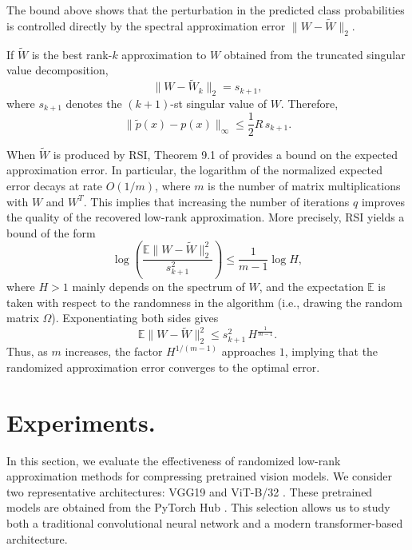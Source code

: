 \documentclass[twoside,leqno,onecolumn]{article}
\begin{document}
\begin{remark}
The bound above shows that the perturbation in the predicted class probabilities is controlled directly by the spectral approximation error $\|W-\widetilde W\|_2$.

If $\widetilde W$ is the best rank-$k$ approximation to $W$ obtained from the truncated singular value decomposition,
\[
\|W-\widetilde W_k\|_2 = s_{k+1},
\]
where $s_{k+1}$ denotes the $(k+1)$-st singular value of $W$. Therefore,
\begin{equation}
\|\widetilde p(x)-p(x)\|_\infty
\le
\frac{1}{2} R\,s_{k+1}.
\end{equation}

When $\widetilde W$ is produced by RSI, Theorem 9.1 of \cite{tropp2023randomized} provides a bound on the expected approximation error. In particular, the logarithm of the normalized expected error decays at rate $O(1/m)$, where $m$ is the number of matrix multiplications with $W$ and $W^T$. This implies that increasing the number of iterations $q$ improves the quality of the recovered low-rank approximation. More precisely, RSI yields a bound of the form
\begin{equation}
\log\!\left(\frac{\mathbb{E}\|W-\widetilde W\|_2^2}{s_{k+1}^2}\right)
\le
\frac{1}{m-1}\log H,
\end{equation}
where $H > 1$ mainly depends on the spectrum of $W$, and the expectation $\mathbb{E}$ is taken with respect to the randomness in the algorithm (i.e., drawing the random matrix $\Omega$). Exponentiating both sides gives
\[
\mathbb{E}\|W-\widetilde W\|_2^2
\le
s_{k+1}^2 \, H^{\frac{1}{m-1}}.
\]
Thus, as $m$ increases, the factor $H^{1/(m-1)}$ approaches $1$, implying that the randomized approximation error converges to the optimal error. 
\end{remark}

\section{Experiments.} In this section, we evaluate the effectiveness of randomized low-rank approximation methods for compressing pretrained vision models. We consider two representative architectures: VGG19 and ViT-B/32 \cite{dosovitskiy2021an} . These pretrained models are obtained from the PyTorch Hub \cite{pytorch_hub}. This selection allows us to study both a traditional convolutional neural network and a modern transformer-based architecture.
\end{document}
